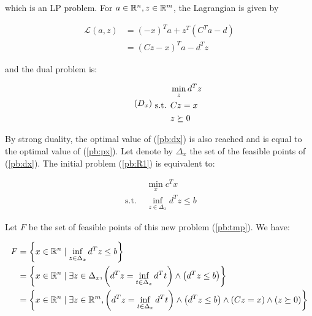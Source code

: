 \documentclass[a4paper, 11pt]{report}
\begin{document}
\noindent which is an LP problem. For $a \in \mathbb{R}^{n}, z \in \mathbb{R}^{m}$, the Lagrangian is given by

\begin{equation*}
    \begin{aligned}
    \mathcal{L} \left( a, z \right) &= \left( -x \right)^{T} a + z^{T} \left( C^{T} a - d \right) \\
    &= \left( C z - x \right)^{T} a - d^{T} z
    \end{aligned}
\end{equation*}

\noindent and the dual problem is:

\begin{equation*}
\tag{$D_{x}$}
    \begin{aligned}
    & \min_{z} d^{T} z \\
    \text{ s.t. } & C z = x \\
    & z \succeq 0
    \end{aligned}
\label{pb:dx}
\end{equation*}

\noindent By strong duality, the optimal value of (\ref{pb:dx}) is also reached and is equal to the optimal value of (\ref{pb:px}). Let denote by $\Delta_{x}$ the set of the feasible points of (\ref{pb:dx}). The initial problem (\ref{pb:R1}) is equivalent to:

\begin{equation*}
\tag{T}
    \begin{aligned}
    & \min_{x} c^{T} x \\
    \text{ s.t. } & \inf_{z \in \Delta_{x}} d^{T} z \leq b
    \end{aligned}
\label{pb:tmp}
\end{equation*}

\noindent Let $F$ be the set of feasible points of this new problem (\ref{pb:tmp}). We have:

\begin{equation*}
    \begin{aligned}
    F &= \left\{ x \in \mathbb{R}^{n} \mid \inf_{z \in \Delta_{x}} d^{T} z \leq b\right\} \\
    &= \left\{ x \in \mathbb{R}^{n} \mid  \exists z \in \Delta_{x}, \left( d^{T}z = \inf_{t \in \Delta_{x}} d^{T} t \right) \wedge \left( d^{T}z \leq b \right)\right\} \\
    &= \left\{ x \in \mathbb{R}^{n} \mid \exists z \in \mathbb{R}^{m}, \left( d^{T}z = \inf_{t \in \Delta_{x}} d^{T} t \right) \wedge \left( d^{T}z \leq b \right) \wedge \left( C z = x \right) \wedge \left( z \succeq 0 \right)\right\}
    \end{aligned}
\end{equation*}
\end{document}

